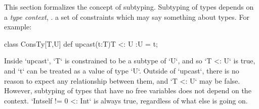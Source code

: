 This section formalizes the concept of subtyping. Subtyping of types depends
on a {\em type context}, \viz. a set of constraints which may say something
about types.   For example: 

\begin{xten}
class ConsTy[T,U] {
   def upcast(t:T){T <: U} :U = t;
}
\end{xten}
%
\noindent
Inside \xcd`upcast`, \xcd`T` is constrained to be a subtype of \xcd`U`, and so
\xcd`T <: U` is true, and \xcd`t` can be treated as a value of type \xcd`U`.  
Outside of \xcd`upcast`, there is no reason to expect any relationship between
them, and \xcd`T <: U` may be false.
However, subtyping of types that have no free variables does not depend
on the context.    \xcd`Int{self != 0} <: Int` is always
true, regardless of what else is going on.




